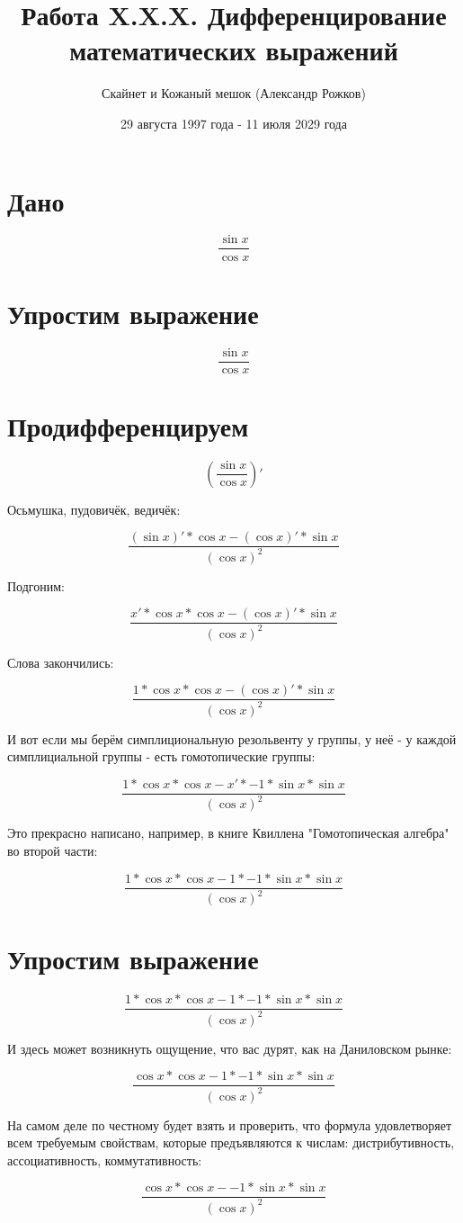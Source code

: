 \documentclass[12pt]{article}
\title{Работа X.X.X. Дифференцирование математических выражений}
\author{Скайнет и Кожаный мешок (Александр Рожков)}
\date{29 августа 1997 года - 11 июля 2029 года}
\begin{document}
\maketitle
\newpage


\section{Дано}

$$ \frac{\sin{x  }  }{\cos{x  }  }  $$

\section{Упростим выражение}

$$ \frac{\sin{x  }  }{\cos{x  }  }  $$

\section{Продифференцируем}

$$ ( \frac{\sin{x  }  }{\cos{x  }  } )' $$

Осьмушка, пудовичёк, ведичёк:

$$ \frac{( \sin{x  } )' * \cos{x  }   - ( \cos{x  } )' * \sin{x  }    }{{( \cos{x  } ) }^{2  }  }  $$

Подгоним:

$$ \frac{x ' * \cos{x  }   * \cos{x  }   - ( \cos{x  } )' * \sin{x  }    }{{( \cos{x  } ) }^{2  }  }  $$

Слова закончились:

$$ \frac{1  * \cos{x  }   * \cos{x  }   - ( \cos{x  } )' * \sin{x  }    }{{( \cos{x  } ) }^{2  }  }  $$

И вот если мы берём симплициональную резольвенту у группы, у неё - у каждой симплициальной группы - есть гомотопические группы:

$$ \frac{1  * \cos{x  }   * \cos{x  }   - x ' * -1  * \sin{x  }    * \sin{x  }    }{{( \cos{x  } ) }^{2  }  }  $$

Это прекрасно написано, например, в книге Квиллена "Гомотопическая алгебра" во второй части:

$$ \frac{1  * \cos{x  }   * \cos{x  }   - 1  * -1  * \sin{x  }    * \sin{x  }    }{{( \cos{x  } ) }^{2  }  }  $$

\section{Упростим выражение}

$$ \frac{1  * \cos{x  }   * \cos{x  }   - 1  * -1  * \sin{x  }    * \sin{x  }    }{{( \cos{x  } ) }^{2  }  }  $$

И здесь может возникнуть ощущение, что вас дурят, как на Даниловском рынке:

$$ \frac{\cos{x  }  * \cos{x  }   - 1  * -1  * \sin{x  }    * \sin{x  }    }{{( \cos{x  } ) }^{2  }  }  $$

На самом деле по честному будет взять и проверить, что формула удовлетворяет всем требуемым свойствам, которые предъявляются к числам: дистрибутивность, ассоциативность, коммутативность:

$$ \frac{\cos{x  }  * \cos{x  }   - -1  * \sin{x  }   * \sin{x  }    }{{( \cos{x  } ) }^{2  }  }  $$
\end{document}
